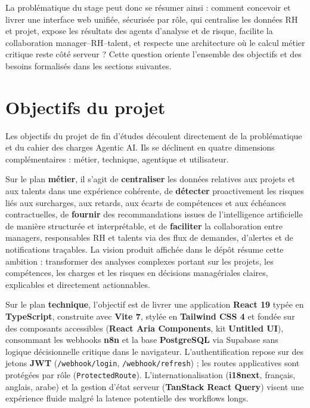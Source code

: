 La problématique du stage peut donc se résumer ainsi : comment concevoir et livrer une interface web unifiée, sécurisée par rôle, qui centralise les données RH et projet, expose les résultats des agents d'analyse et de risque, facilite la collaboration manager--RH--talent, et respecte une architecture où le calcul métier critique reste côté serveur ? Cette question oriente l'ensemble des objectifs et des besoins formalisés dans les sections suivantes.

\section{Objectifs du projet}

Les objectifs du projet de fin d'études découlent directement de la problématique et du cahier des charges Agentic AI. Ils se déclinent en quatre dimensions complémentaires : métier, technique, agentique et utilisateur.

Sur le plan \textbf{métier}, il s'agit de \textbf{centraliser} les données relatives aux projets et aux talents dans une expérience cohérente, de \textbf{détecter} proactivement les risques liés aux surcharges, aux retards, aux écarts de compétences et aux échéances contractuelles, de \textbf{fournir} des recommandations issues de l'intelligence artificielle de manière structurée et interprétable, et de \textbf{faciliter} la collaboration entre managers, responsables RH et talents via des flux de demandes, d'alertes et de notifications traçables. La vision produit affichée dans le dépôt résume cette ambition : transformer des analyses complexes portant sur les projets, les compétences, les charges et les risques en décisions managériales claires, explicables et directement actionnables.

Sur le plan \textbf{technique}, l'objectif est de livrer une application \textbf{React 19} typée en \textbf{TypeScript}, construite avec \textbf{Vite 7}, stylée en \textbf{Tailwind CSS 4} et fondée sur des composants accessibles (\textbf{React Aria Components}, kit \textbf{Untitled UI}), consommant les webhooks \textbf{n8n} et la base \textbf{PostgreSQL} via Supabase sans logique décisionnelle critique dans le navigateur. L'authentification repose sur des jetons \textbf{JWT} (\texttt{/webhook/login}, \texttt{/webhook/refresh}) ; les routes applicatives sont protégées par rôle (\texttt{ProtectedRoute}). L'internationalisation (\textbf{i18next}, français, anglais, arabe) et la gestion d'état serveur (\textbf{TanStack React Query}) visent une expérience fluide malgré la latence potentielle des workflows longs.

